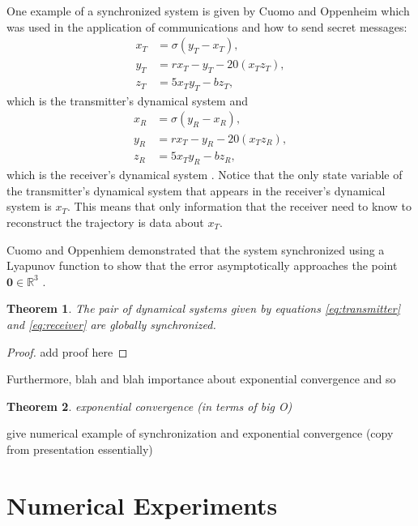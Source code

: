 \documentclass[12pt]{article}
\newtheorem{theorem}{Theorem}[section]
\begin{document}
      One example of a synchronized system is given by Cuomo and Oppenheim which was used in the application of communications and how to send secret messages: 
      \begin{equation}\label{eq:transmitter}
      \begin{aligned}
        x_T &= \sigma (y_T-x_T), \\
        y_T &= r  x_T - y_T - 20 (x_T   z_T),\\
        z_T &= 5 x_T y_T - b  z_T,
      \end{aligned}
    \end{equation} 
    which is the transmitter's dynamical system and 
    \begin{equation}\label{eq:receiver}
      \begin{aligned}
        x_R &= \sigma (y_R-x_R), \\
        y_R &= r  x_T - y_R - 20 (x_T   z_R),\\
        z_R &= 5 x_T y_R - b  z_R,
      \end{aligned}
    \end{equation}
    which is the receiver's dynamical system \cite{cuomo1993}. Notice that the only state variable of the transmitter's dynamical system that appears in the receiver's dynamical system is $x_T$. This means that only information that the receiver need to know to reconstruct the trajectory is data about $x_T$.  

    Cuomo and Oppenhiem demonstrated that the system synchronized using a Lyapunov function to show that the error asymptotically approaches the point $\mathbf{0} \in \mathbb{R}^3$ \cite{cuomo1993}. 
      \begin{theorem}
        The pair of dynamical systems given by equations \ref{eq:transmitter} and \ref{eq:receiver} are globally synchronized. 
      \end{theorem}
      \begin{proof} 
        add proof here 
      \end{proof}
      Furthermore, blah and blah importance about exponential convergence and so 
      \begin{theorem}
        exponential convergence (in terms of big O) 
      \end{theorem}
      give numerical example of synchronization and exponential convergence (copy from presentation essentially)
    \section{Numerical Experiments}
\end{document}

